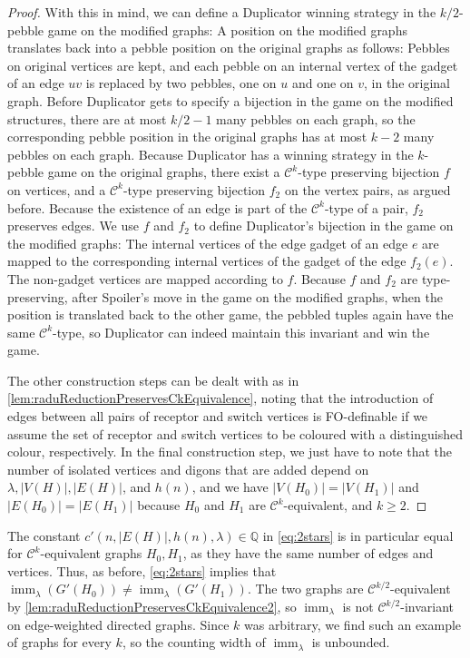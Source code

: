 \documentclass[11pt, DIV=15]{scrarticle}
\theoremstyle{definition}
\theoremstyle{plain}
\theoremstyle{remark}
\newcommand{\bbQ}{\mathbb{Q}}
\DeclareMathOperator{\imm}{imm}
\begin{document}
\begin{proof}
With this in mind, we can define a Duplicator winning strategy in the $k/2$-pebble game on the modified graphs: A position on the modified graphs translates back into a pebble position on the original graphs as follows: Pebbles on original vertices are kept, and each pebble on an internal vertex of the gadget of an edge $uv$ is replaced by two pebbles, one on $u$ and one on $v$, in the original graph. Before Duplicator gets to specify a bijection in the game on the modified structures, there are at most $k/2-1$ many pebbles on each graph, so the corresponding pebble position in the original graphs has at most $k-2$ many pebbles on each graph. Because Duplicator has a winning strategy in the $k$-pebble game on the original graphs, there exist a $\mathcal{C}^k$-type preserving bijection $f$ on vertices, and a $\mathcal{C}^k$-type preserving bijection $f_2$ on the vertex pairs, as argued before. Because the existence of an edge is part of the $\mathcal{C}^k$-type of a pair, $f_2$ preserves edges. We use $f$ and $f_2$ to define Duplicator's bijection in the game on the modified graphs: The internal vertices of the edge gadget of an edge $e$ are mapped to the corresponding internal vertices of the gadget of the edge $f_2(e)$. The non-gadget vertices are mapped according to $f$. Because $f$ and $f_2$ are type-preserving, after Spoiler's move in the game on the modified graphs, when the position is translated back to the other game, the pebbled tuples again have the same $\mathcal{C}^k$-type, so Duplicator can indeed maintain this invariant and win the game.

The other construction steps can be dealt with as in \cref{lem:raduReductionPreservesCkEquivalence}, noting that the introduction of edges between all pairs of receptor and switch vertices is FO-definable if we assume the set of receptor and switch vertices to be coloured with a distinguished colour, respectively. 
In the final construction step, we just have to note that the number of isolated vertices and digons that are added depend on $\lambda, |V(H)|, |E(H)|$, and $h(n)$, and we have $|V(H_0)| = |V(H_1)|$ and $|E(H_0)| = |E(H_1)|$ because $H_0$ and $H_1$ are $\mathcal{C}^k$-equivalent, and $k \geq 2$.
\end{proof}	
The constant $c'(n, |E(H)|, h(n), \lambda) \in \bbQ$ in \cref{eq:2stars} is in particular equal for $\mathcal{C}^k$-equivalent graphs $H_0, H_1$, as they have the same number of edges and vertices.
Thus, as before, \cref{eq:2stars} implies that $\imm_{\lambda}(G'(H_0)) \neq \imm_{\lambda}(G'(H_1))$. The two graphs are $\mathcal{C}^{k/2}$-equivalent by \cref{lem:raduReductionPreservesCkEquivalence2}, so $\imm_{\lambda}$ is not $\mathcal{C}^{k/2}$-invariant on edge-weighted directed graphs. Since $k$ was arbitrary, we find such an example of graphs for every $k$, so the counting width of $\imm_{\lambda}$ is unbounded.
\end{document}
